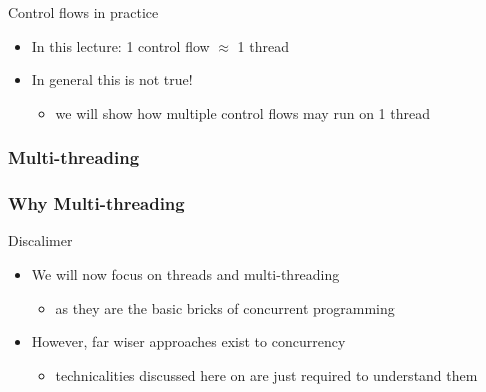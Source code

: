 \documentclass{beamer}\mode<presentation>{\usetheme{AMSBolognaFC}}
\begin{document}
\begin{frame}[allowframebreaks]
    \begin{exampleblock}{Control flows in practice}
        \begin{itemize}
            \item In this lecture: 1 control flow $\approx$ 1 thread
            \item In general this is not true!
            \begin{itemize}
                \item we will show how multiple control flows may run on 1 thread
            \end{itemize}
        \end{itemize}
    \end{exampleblock}
\end{frame}

\subsubsection{Multi-threading}

\begin{frame}
    \frametitle{Why Multi-threading}

    \begin{alertblock}{Discalimer}
        \begin{itemize}
            \item We will now focus on \alert{threads} and \alert{multi-threading}
            \begin{itemize}
                \item as they are the basic bricks of concurrent programming
            \end{itemize}

            \item However, far wiser approaches exist to concurrency
            \begin{itemize}
                \item technicalities discussed here on are just required to understand them
            \end{itemize}
        \end{itemize}
    \end{alertblock}

\end{frame}
\end{document}
